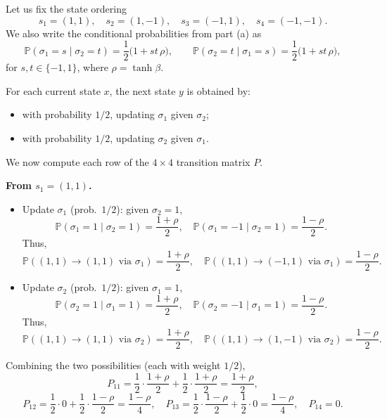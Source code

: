 \documentclass[answers,12pt,addpoints]{exam}
\begin{document}
\begin{enumerate}
\begin{solution}
Let us fix the state ordering
\[
s_1 = (1,1),\quad s_2 = (1,-1),\quad s_3 = (-1,1),\quad s_4 = (-1,-1).
\]
We also write the conditional probabilities from part (a) as
\[
\mathbb{P}(\sigma_1 = s \mid \sigma_2 = t)
= \frac{1}{2}\bigl(1 + s t\, \rho\bigr),\qquad
\mathbb{P}(\sigma_2 = t \mid \sigma_1 = s)
= \frac{1}{2}\bigl(1 + s t\, \rho\bigr),
\]
for $s,t \in \{-1,1\}$, where $\rho = \tanh \beta$.

For each current state $x$, the next state $y$ is obtained by:
\begin{itemize}
\item with probability $1/2$, updating $\sigma_1$ given $\sigma_2$;
\item with probability $1/2$, updating $\sigma_2$ given $\sigma_1$.
\end{itemize}
We now compute each row of the $4\times 4$ transition matrix $P$.

\medskip
\noindent\textbf{From $s_1=(1,1)$.}
\begin{itemize}
\item Update $\sigma_1$ (prob.\ $1/2$): given $\sigma_2=1$,
\[
\mathbb{P}(\sigma_1=1\mid\sigma_2=1)=\frac{1+\rho}{2},\quad
\mathbb{P}(\sigma_1=-1\mid\sigma_2=1)=\frac{1-\rho}{2}.
\]
Thus,
\[
\mathbb{P}((1,1)\to(1,1) \text{ via }\sigma_1) = \frac{1+\rho}{2},\quad
\mathbb{P}((1,1)\to(-1,1) \text{ via }\sigma_1) = \frac{1-\rho}{2}.
\]
\item Update $\sigma_2$ (prob.\ $1/2$): given $\sigma_1=1$,
\[
\mathbb{P}(\sigma_2=1\mid\sigma_1=1)=\frac{1+\rho}{2},\quad
\mathbb{P}(\sigma_2=-1\mid\sigma_1=1)=\frac{1-\rho}{2}.
\]
Thus,
\[
\mathbb{P}((1,1)\to(1,1) \text{ via }\sigma_2) = \frac{1+\rho}{2},\quad
\mathbb{P}((1,1)\to(1,-1) \text{ via }\sigma_2) = \frac{1-\rho}{2}.
\]
\end{itemize}
Combining the two possibilities (each with weight $1/2$),
\[
P_{11} = \frac{1}{2}\cdot\frac{1+\rho}{2} + \frac{1}{2}\cdot\frac{1+\rho}{2}
= \frac{1+\rho}{2},
\]
\[
P_{12} = \frac{1}{2}\cdot 0 + \frac{1}{2}\cdot\frac{1-\rho}{2}
= \frac{1-\rho}{4},
\quad
P_{13} = \frac{1}{2}\cdot\frac{1-\rho}{2} + \frac{1}{2}\cdot 0
= \frac{1-\rho}{4},
\quad
P_{14} = 0.
\]


\end{solution}
\end{enumerate}
\end{document}
